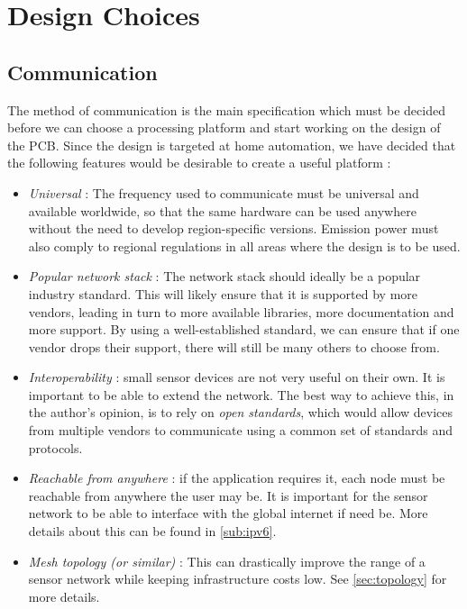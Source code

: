 \chapter{Design Choices}\label{ch:choices}

\section{Communication}\label{sec:communication}

The method of communication is the main specification which must be decided
before we can choose a processing platform and start working on the design of
the PCB. Since the design is targeted at home automation, we have decided that
the following features would be desirable to create a useful platform :

\begin{itemize}
  \item \emph{Universal} :
    The frequency used to communicate must be universal and available worldwide,
    so that the same hardware can be used anywhere without the need to develop
    region-specific versions. Emission power must also comply to regional
    regulations in all areas where the design is to be used.

  \item \emph{Popular network stack} : 
    The network stack should ideally be a popular industry standard. This will
    likely ensure that it is supported by more vendors, leading in turn to more
    available libraries, more documentation and more support. By using
    a well-established standard, we can ensure that if one vendor drops their
    support, there will still be many others to choose from.

  \item \emph{Interoperability} : small sensor devices are not very useful on
    their own. It is important to be able to extend the network. The best way to
    achieve this, in the author's opinion, is to rely on \emph{open standards},
    which would allow devices from multiple vendors to communicate using
    a common set of standards and protocols. 

  \item \emph{Reachable from anywhere} : if the application requires it, each
    node must be reachable from anywhere the user may be. It is important for
    the sensor network to be able to interface with the global internet if need
    be. More details about this can be found in \autoref{sub:ipv6}.

  \item \emph{Mesh topology (or similar)} : This can drastically improve the
    range of a sensor network while keeping infrastructure costs low. See
    \autoref{sec:topology} for more details.
\end{itemize}


